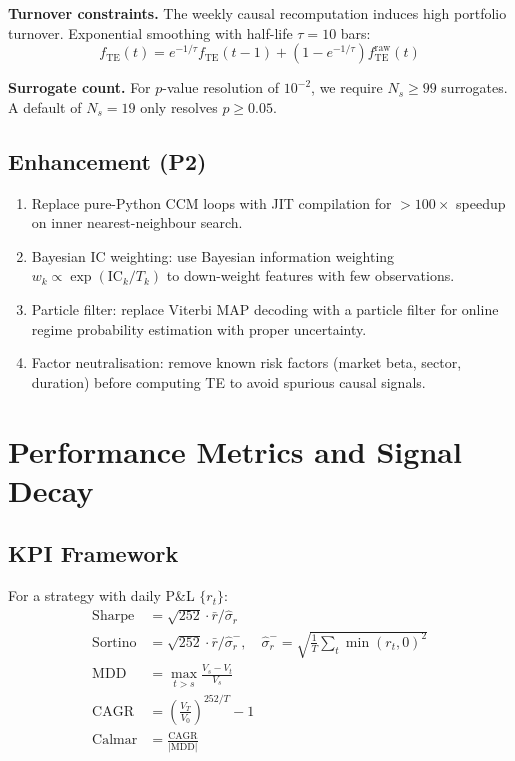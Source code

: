 \documentclass[11pt]{article}
\begin{document}
\textbf{Turnover constraints.} The weekly causal recomputation induces high portfolio turnover. Exponential smoothing with half-life $\tau = 10$ bars:
\begin{equation}
f_{\text{TE}}(t) = e^{-1/\tau} f_{\text{TE}}(t-1) + \left(1 - e^{-1/\tau}\right) f_{\text{TE}}^{\text{raw}}(t)
\label{eq:te-smoothing}
\end{equation}

\textbf{Surrogate count.} For $p$-value resolution of $10^{-2}$, we require $N_s \geq 99$ surrogates. A default of $N_s = 19$ only resolves $p \geq 0.05$.

\subsection{Enhancement (P2)}

\begin{enumerate}
\item Replace pure-Python CCM loops with JIT compilation for $>100\times$ speedup on inner nearest-neighbour search.
\item Bayesian IC weighting: use Bayesian information weighting $w_k \propto \exp(\text{IC}_k/T_k)$ to down-weight features with few observations.
\item Particle filter: replace Viterbi MAP decoding with a particle filter for online regime probability estimation with proper uncertainty.
\item Factor neutralisation: remove known risk factors (market beta, sector, duration) before computing TE to avoid spurious causal signals.
\end{enumerate}

\section{Performance Metrics and Signal Decay}

\subsection{KPI Framework}

For a strategy with daily P\&L $\{r_t\}$:
\begin{align}
\text{Sharpe} &= \sqrt{252} \cdot \bar{r}/\hat{\sigma}_r \label{eq:sharpe} \\
\text{Sortino} &= \sqrt{252} \cdot \bar{r}/\hat{\sigma}_r^-, \quad \hat{\sigma}_r^- = \sqrt{\frac{1}{T}\sum_t \min(r_t,0)^2} \label{eq:sortino} \\
\text{MDD} &= \max_{t>s} \frac{V_s - V_t}{V_s} \label{eq:mdd} \\
\text{CAGR} &= \left(\frac{V_T}{V_0}\right)^{252/T} - 1 \label{eq:cagr} \\
\text{Calmar} &= \frac{\text{CAGR}}{|\text{MDD}|} \label{eq:calmar}
\end{align}
\end{document}
